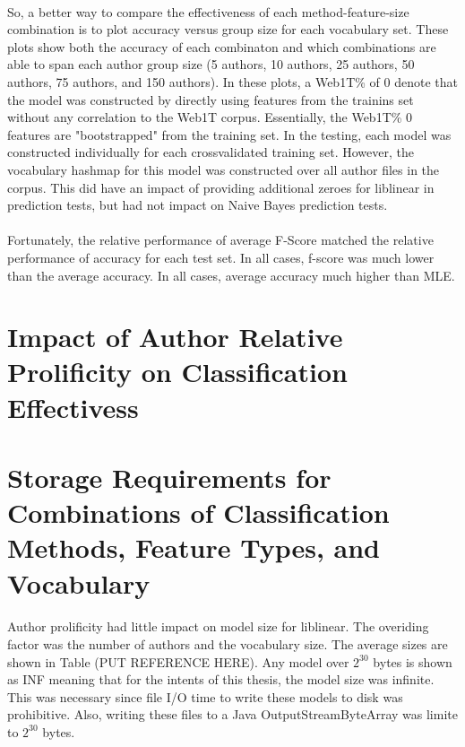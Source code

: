 	\paragraph*{}So, a better way to compare the effectiveness of each method-feature-size combination is to plot accuracy versus group size for each vocabulary set.  These plots show both the accuracy of each combinaton and which combinations are able to span each author group size (5 authors, 10 authors, 25 authors, 50 authors, 75 authors, and 150 authors).  In these plots, a Web1T\% of 0 denote that the model was constructed by directly using features from the trainins set without any correlation to the Web1T corpus.  Essentially, the Web1T\% 0 features are "bootstrapped" from the training set.  In the testing, each model was constructed individually for each crossvalidated training set.  However, the vocabulary hashmap for this model was constructed over all author files in the corpus.  This did have an impact of providing additional zeroes for liblinear in prediction tests, but had not impact on Naive Bayes prediction tests.
	
	
	
	\paragraph*{}Fortunately, the relative performance of average F-Score matched the relative performance of accuracy for each test set.  In all cases, f-score was much lower than the average accuracy.  In all cases, average accuracy much higher than MLE.

\section{Impact of Author Relative Prolificity on Classification Effectivess}


\section{Storage Requirements for Combinations of Classification Methods, Feature Types, and Vocabulary}
	\paragraph*{} Author prolificity had little impact on model size for liblinear.  The overiding factor was the number of authors and the vocabulary size.  The average sizes are shown in Table (PUT REFERENCE HERE).  Any model over $2^30$ bytes is shown as INF meaning that for the intents of this thesis, the model size was infinite.  This was necessary since file I/O time to write these models to disk was prohibitive.  Also, writing these files to a Java OutputStreamByteArray was limite to $2^30$ bytes.
	
